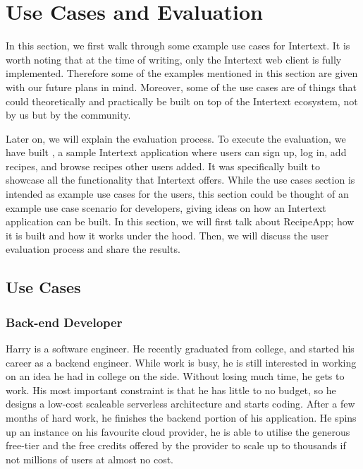 
\chapter{Use Cases and Evaluation} \label{evaluation}

In this section, we first walk through some example use cases for Intertext. It is worth noting that at the time of writing, only the Intertext web client is fully implemented. Therefore some of the examples mentioned in this section are given with our future plans in mind. Moreover, some of the use cases are of things that could theoretically and practically be built on top of the Intertext ecosystem, not by us but by the community. 

Later on, we will explain the evaluation process. To execute the evaluation, we have built , a sample Intertext application where users can sign up, log in, add recipes, and browse recipes other users added. It was specifically built to showcase all the functionality that Intertext offers. While the use cases section is intended as example use cases for the users, this section could be thought of an example use case scenario for developers, giving ideas on how an Intertext application can be built. In this section, we will first talk about RecipeApp; how it is built and how it works under the hood. Then, we will discuss the user evaluation process and share the results.

\section{Use Cases}

\subsection{Back-end Developer}

Harry is a software engineer. He recently graduated from college, and started his career as a backend engineer. While work is busy, he is still interested in working on an idea he had in college on the side. Without losing much time, he gets to work. His most important constraint is that he has little to no budget, so he designs a low-cost scaleable serverless architecture and starts coding. After a few months of hard work, he finishes the backend portion of his application. He spins up an instance on his favourite cloud provider, he is able to utilise the generous free-tier and the free credits offered by the provider to scale up to thousands if not millions of users at almost no cost. 

